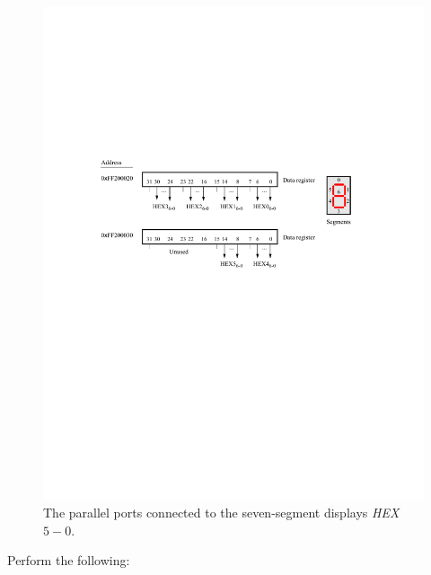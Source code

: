 \documentclass[epsfig,10pt,fullpage]{article}
\begin{document}
~\\
\begin{figure}[htb]
	\begin{center}
	\includegraphics[scale=1]{figures/figureHEX.pdf}
	\end{center}
	\caption{The parallel ports connected to the seven-segment displays {\it HEX}$5-0$.}
\label{fig:HEX}
\end{figure}

\newpage
Perform the following:
\end{document}
